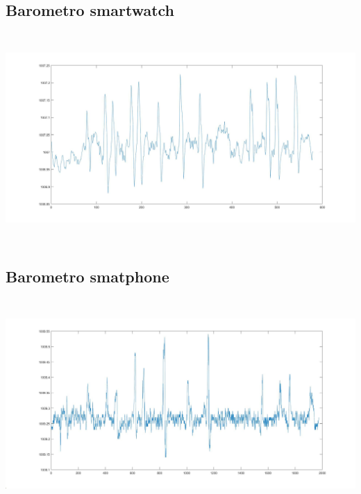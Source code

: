 \documentclass[a4paper, oneside]{book}
\begin{document}
\subsection{Barometro smartwatch\\} 
\begin{minipage}{\linewidth}
\begin{center}
\includegraphics[width=160mm, height= 80mm]{./images/registrazione_tesi/pressure_phone.jpg} 
\end{center}
\end{minipage}
\makebox[\linewidth]{}
\makebox[\linewidth]{}\makebox[\linewidth]{}\makebox[\linewidth]{}
\makebox[\linewidth]{}\makebox[\linewidth]{}\makebox[\linewidth]{}
\makebox[\linewidth]{}\makebox[\linewidth]{}\makebox[\linewidth]{}
\makebox[\linewidth]{}\makebox[\linewidth]{}\makebox[\linewidth]{}

\subsection{Barometro smatphone\\} 
\makebox[\linewidth]{}
\begin{minipage}{\linewidth}
\begin{center}
\includegraphics[width=160mm, height= 80mm]{./images/registrazione_tesi/pressure_watch.jpg} 
\end{center}
\end{minipage}
\end{document}
